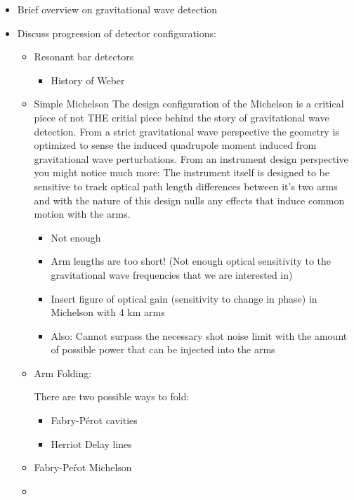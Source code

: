 \begin{itemize}
\item Brief overview on gravitational wave detection
\item Discuss progression of detector configurations:
\begin{itemize}
\item Resonant bar detectors
\begin{itemize}
\item History of Weber
\end{itemize}
\item Simple Michelson
The design configuration of the Michelson is a critical piece of not THE critial piece behind the story of gravitational wave detection. From a strict gravitational wave perspective the geometry is optimized to sense the induced quadrupole moment induced from gravitational wave perturbations. From an instrument design perspective you might notice much more: The instrument itself is designed to be sensitive to track optical path length differences between it's two arms and with the nature of this design nulls any effects that induce common motion with the arms. 
\begin{itemize}
\item Not enough
\item Arm lengths are too short! (Not enough optical sensitivity to the gravitational wave frequencies that we are interested in)
\item Insert figure of optical gain (sensitivity to change in phase) in Michelson with 4 km arms
\item Also: Cannot surpass the necessary shot noise limit with the amount of possible power that can be injected into the arms
\end{itemize}
\item Arm Folding:
\begin{itemize}
There are two possible ways to fold:
\begin{itemize}
\item Fabry-Pérot cavities
\item Herriot Delay lines
\end{itemize}
\end{itemize}
\item Fabry-Pe\'rot Michelson
\item
\end{itemize}
\end{itemize}
